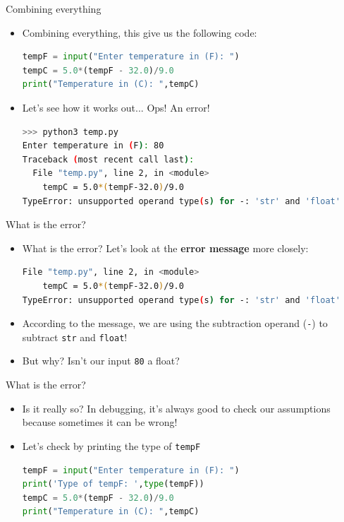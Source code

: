 \documentclass[10pt,xcolor={table,dvipsnames},t]{beamer}
\begin{document}
\begin{frame}[fragile]{Combining everything}
  \begin{itemize}
    \item Combining everything, this give us the following code:
\begin{lstlisting}[language=python]
tempF = input("Enter temperature in (F): ")
tempC = 5.0*(tempF - 32.0)/9.0
print("Temperature in (C): ",tempC)
\end{lstlisting}
  \item Let's see how it works out... Ops! An error!
\begin{lstlisting}[language=bash]
>>> python3 temp.py
Enter temperature in (F): 80
Traceback (most recent call last):
  File "temp.py", line 2, in <module>
    tempC = 5.0*(tempF-32.0)/9.0
TypeError: unsupported operand type(s) for -: 'str' and 'float'
\end{lstlisting}
  \end{itemize}
\end{frame}

\begin{frame}[fragile]{What is the error?}
  \begin{itemize}
    \item What is the error? Let's look at the \textbf{error message} more closely:
  \begin{lstlisting}[language=bash]
    File "temp.py", line 2, in <module>
    tempC = 5.0*(tempF-32.0)/9.0
TypeError: unsupported operand type(s) for -: 'str' and 'float'
\end{lstlisting}
  \item According to the message, we are using the subtraction operand (\texttt{-}) to subtract \texttt{str} and \texttt{float}!
  \item But why? Isn't our input \texttt{80} a float?
  \end{itemize}
\end{frame}

\begin{frame}[fragile]{What is the error?}
  \begin{itemize}
    \item  Is it really so? In debugging, it's always good to check our assumptions because sometimes it can be wrong!
    \item Let's check by printing the type of \texttt{tempF}
\begin{lstlisting}[language=python]
tempF = input("Enter temperature in (F): ")
print('Type of tempF: ',type(tempF))
tempC = 5.0*(tempF - 32.0)/9.0
print("Temperature in (C): ",tempC)
\end{lstlisting}
  \end{itemize}
\end{frame}
\end{document}

